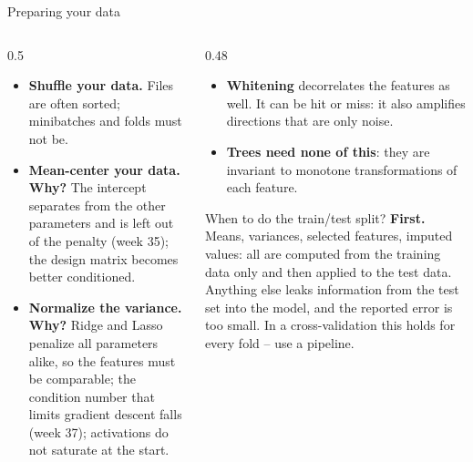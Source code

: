 \documentclass[10pt,aspectratio=169]{beamer}
\begin{document}
\begin{frame}{Preparing your data}
\begin{columns}[T]
\begin{column}{0.5\textwidth}
\small
\begin{itemize}
  \item \textbf{Shuffle your data.}  Files are often sorted; minibatches and
    folds must not be.
  \item \textbf{Mean-center your data.  Why?}  The intercept separates from
    the other parameters and is left out of the penalty (week 35); the
    design matrix becomes better conditioned.
  \item \textbf{Normalize the variance.  Why?}  Ridge and Lasso penalize all
    parameters alike, so the features must be comparable; the condition
    number that limits gradient descent falls (week 37); activations do not
    saturate at the start.
\end{itemize}
\end{column}
\begin{column}{0.48\textwidth}
\small
\begin{itemize}
  \item \textbf{Whitening} decorrelates the features as well.  It can be
    hit or miss: it also amplifies directions that are only noise.
  \item \textbf{Trees need none of this}: they are invariant to monotone
    transformations of each feature.
\end{itemize}
\begin{block}{When to do the train/test split?}
\footnotesize
\textbf{First.}  Means, variances, selected features, imputed values: all
are computed from the training data only and then applied to the test data.
Anything else leaks information from the test set into the model, and the
reported error is too small.  In a cross-validation this holds for every
fold -- use a pipeline.
\end{block}
\end{column}
\end{columns}
\end{frame}
\end{document}
